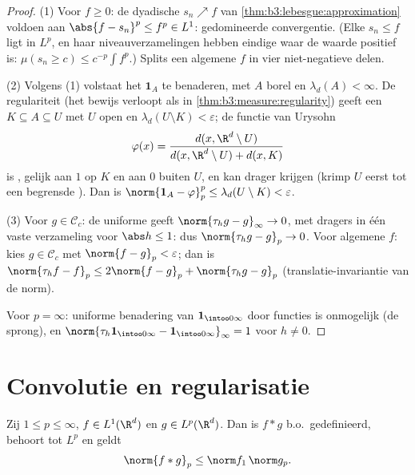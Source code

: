 \begin{proof}
(1) Voor $f \geq 0$: de dyadische $s_n \nearrow f$ van
\cref{thm:b3:lebesgue:approximation} voldoen aan $\abs{f -
s_n}^p \leq f^p \in L^1$: gedomineerde convergentie. (Elke $s_n
\leq f$ ligt in $L^p$, en haar niveauverzamelingen hebben
eindige  waar de waarde positief is: $\mu(s_n \geq c) \leq
c^{-p}\int f^p$.) Splits een algemene $f$ in vier
niet-negatieve delen.

(2) Volgens (1) volstaat het $\mathbf 1_A$ te benaderen, met $A$
borel en $\lambda_d(A) < \infty$. De regulariteit (het bewijs
verloopt als in \cref{thm:b3:measure:regularity}) geeft een
 $K \subseteq A \subseteq U$ met $U$ open en
$\lambda_d(U\setminus K) < \varepsilon$; de functie van Urysohn
\[
\varphi(x) = \frac{d(x, \R^d\setminus U)}{d(x, \R^d\setminus U)
+ d(x, K)}
\]
is , gelijk aan $1$ op $K$ en aan $0$ buiten $U$, en kan
 drager krijgen (krimp $U$ eerst tot een begrensde ). Dan is $\norm{\mathbf 1_A - \varphi}_p^p \leq
\lambda_d(U\setminus K) < \varepsilon$.

(3) Voor $g \in \mathcal C_c$: de uniforme  geeft
$\norm{\tau_hg - g}_\infty \to 0$, met dragers in één vaste
 verzameling voor $\abs h \leq 1$: dus $\norm{\tau_hg -
g}_p \to 0$. Voor algemene $f$: kies $g \in \mathcal C_c$ met
$\norm{f - g}_p < \varepsilon$; dan is $\norm{\tau_hf - f}_p
\leq 2\norm{f - g}_p + \norm{\tau_hg - g}_p$
(translatie-invariantie van de norm).

Voor $p = \infty$: uniforme benadering van $\mathbf
1_{\intoo0\infty}$ door  functies is onmogelijk (de
sprong), en $\norm{\tau_h\mathbf 1_{\intoo0\infty} - \mathbf
1_{\intoo0\infty}}_\infty = 1$ voor $h \neq 0$.
\end{proof}

\section{Convolutie en regularisatie}

\begin{theorem}\label{thm:b3:lp:young}
Zij $1 \leq p \leq \infty$, $f \in L^1(\R^d)$ en $g \in
L^p(\R^d)$. Dan is $f * g$ b.o.\ gedefinieerd, behoort tot $L^p$
en geldt
\[
\norm{f * g}_p \leq \norm f_1\,\norm g_p .
\]
\end{theorem}

